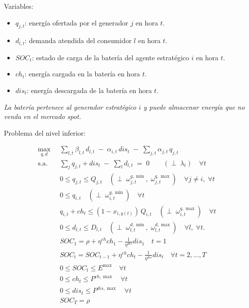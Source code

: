 \documentclass[a4paper,11pt]{article}
\begin{document}
Variables:
\begin{itemize}
    \item $q_{j,t}$: energía ofertada por el generador $j$ en hora $t$.
    \item $d_{l,t}$: demanda atendida del consumidor $l$ en hora $t$.
    \item $SOC_t$: estado de carga de la batería del agente estratégico $i$ en hora $t$.
    \item $ch_t$: energía cargada en la batería en hora $t$.
    \item $dis_t$: energía descargada de la batería en hora $t$.
\end{itemize}

\textit{La batería pertenece al generador estratégico $i$ y puede almacenar energía que no venda en el mercado spot.}

Problema del nivel inferior:

\begin{align}
\max_{q,d}\;\;
& \sum_{l,t} \beta_{l,t}\, d_{l,t}
\;-\; \alpha_{i,t}\, dis_t 
\;-\; \sum_{j,t} \alpha_{j,t}\, q_{j,t}
\label{LF_obj}\\[2mm]
\text{s.a.}\;\;
& \sum_{j} q_{j,t} + dis_t \;-\; \sum_{l} d_{l,t}  \;=\; 0 
\qquad (\perp\; \lambda_t)\quad \forall t
\label{LF_balance}\\
& 0 \le q_{j,t} \le Q_{j,t} 
\quad (\perp\; \omega^{q,\min}_{j,t},\;\omega^{q,\max}_{j,t})
\quad \forall j\neq i,\; \forall t
\label{LF_cap_others}\\
& 0 \le q_{i,t}
\quad (\perp\; \omega^{q,\min}_{i,t})
\quad \forall t
\label{LF_cap_i_min}\\
& q_{i,t} + ch_t \le (1-x_{i,y(t)})\,Q_{i,t}
\quad (\perp\; \omega^{q,\max}_{i,t})
\quad \forall t
\label{LF_cap_i_max}\\
& 0 \le d_{l,t} \le D_{l,t} 
\quad (\perp\; \omega^{d,\min}_{l,t},\;\omega^{d,\max}_{l,t})
\quad \forall l,\; \forall t.
\label{LF_dem}\\
& SOC_1 = \rho + \eta^{ch} ch_1 - \frac{1}{\eta^{dis}} dis_1 \quad t=1 \\
& SOC_t = SOC_{t-1} + \eta^{ch} ch_t - \frac{1}{\eta^{dis}} dis_t \quad \forall t=2,\dots,T \\
& 0 \leq SOC_t \leq E^{\max} \quad \forall t \\
& 0 \leq ch_t \leq P^{ch,\max} \quad \forall t \\
& 0 \leq dis_t \leq P^{dis,\max} \quad \forall t \\
& SOC_T = \rho \\
\end{align}
\end{document}
